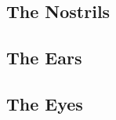 \subsection{The Nostrils} %
\label{sub:the_nose}




\subsection{The Ears} %
\label{sub:the_ears}




\subsection{The Eyes} %
\label{sub:the_eyes}





